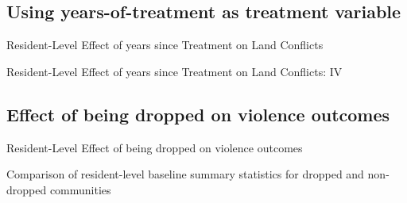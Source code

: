 \documentclass[10pt]{article}
\begin{document}
\subsection{Using years-of-treatment as treatment variable}

\begin{landscape}
\begin{table}[H]
\caption{Resident-Level Effect of years since Treatment on Land Conflicts}
\begin{center}
\begin{adjustbox}{max height = .6\textheight}

\end{adjustbox}
\end{center}
\end{table}

\begin{table}[H]
\caption{Resident-Level Effect of years since Treatment on Land Conflicts: IV}
\begin{center}
\begin{adjustbox}{max width = \textwidth}

\end{adjustbox}
\end{center}
\end{table}
\end{landscape}


\subsection{Effect of being dropped on violence outcomes}
\begin{table}[H]
\caption{Resident-Level Effect of being dropped on violence outcomes}
\label{conflict_adj_p_dropped}
\begin{center}
\begin{adjustbox}{max width = \textwidth}

\end{adjustbox}
\end{center}
\end{table}

\begin{table}[H]
\caption{Comparison of resident-level baseline summary statistics for dropped and non-dropped communities}
\label{summary_table_dropped}
\begin{center}
\begin{adjustbox}{max width = \textwidth}

\end{adjustbox}
\end{center}
\end{table}
\end{document}
